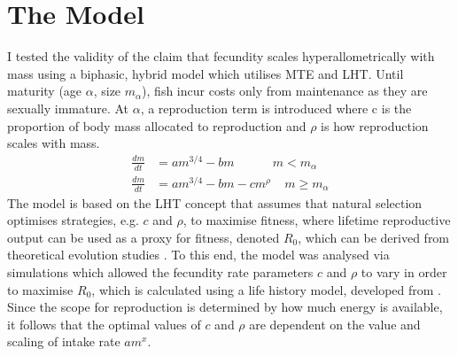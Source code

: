 \documentclass[a4paper]{article} %
\begin{document}
\section{The Model}\thispagestyle{empty}
I tested the validity of the claim that fecundity scales hyperallometrically with mass using a biphasic, hybrid model which utilises MTE and LHT. Until maturity (age $\alpha$, size $m_{\alpha}$), fish incur costs only from maintenance as they are sexually immature. At $\alpha$, a reproduction term is introduced where c is the proportion of body mass allocated to reproduction and $\rho$ is how reproduction scales with mass.
\begin{align*}
    \frac{dm}{dt} &= am^{3/4} - bm \ \ \ \ \ \ \ \ \ \ \ \ \ \ m < m_{\alpha} \\
    \frac{dm}{dt} &= am^{3/4} - bm - cm^{\rho} \ \ \ \ \ m \geq m_{\alpha}
\end{align*}
The model is based on the LHT concept that assumes that natural selection optimises strategies, e.g. $c$ and $\rho$, to maximise fitness, where lifetime reproductive output can be used as a proxy for fitness, denoted $R_0$, which can be derived from theoretical evolution studies \autocite{Charnov2001, stearns1992evolution}. To this end, the model was analysed via simulations which allowed the fecundity rate parameters $c$ and $\rho$ to vary in order to maximise $R_0$, which is calculated using a life history model, developed from \cite{Charnov2001}. Since the scope for reproduction is determined by how much energy is available, it follows that the optimal values of $c$ and $\rho$ are dependent on the value and scaling of intake rate $am^{x}$. 
\end{document}
